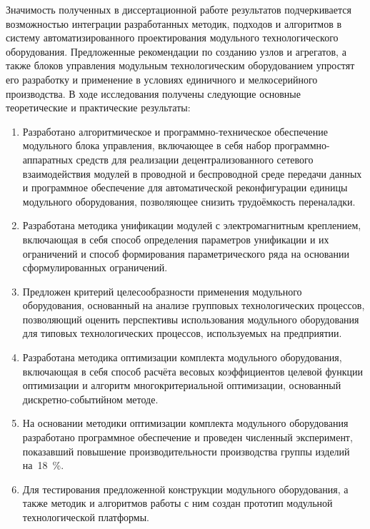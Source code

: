 
Значимость полученных в диссертационной работе результатов подчеркивается возможностью интеграции разработанных методик, подходов и алгоритмов в систему автоматизированного проектирования модульного технологического оборудования. Предложенные рекомендации по созданию узлов и агрегатов, а также блоков управления модульным технологическим оборудованием упростят его разработку и применение в условиях единичного и мелкосерийного производства.  В ходе исследования получены следующие основные теоретические и практические результаты:

\begin{enumerate}
  \item Разработано алгоритмическое и программно-техническое обеспечение модульного блока управления, включающее в себя набор программно-аппаратных средств для реализации децентрализованного сетевого взаимодействия модулей в проводной и беспроводной среде передачи данных и программное обеспечение для автоматической реконфигурации единицы модульного оборудования, позволяющее снизить трудоёмкость переналадки.  
  \item Разработана методика унификации модулей с электромагнитным креплением, включающая в себя способ определения параметров унификации и их ограничений и способ формирования параметрического ряда на основании сформулированных ограничений.
  \item Предложен критерий целесообразности применения модульного оборудования, основанный на анализе групповых технологических процессов, позволяющий оценить  перспективы использования модульного оборудования для типовых технологических процессов, используемых на предприятии.
  \item Разработана методика оптимизации комплекта модульного оборудования, включающая в себя способ расчёта весовых коэффициентов целевой функции оптимизации и алгоритм многокритериальной оптимизации, основанный дискретно-событийном методе.
  \item На основании методики оптимизации комплекта модульного оборудования разработано программное обеспечение и проведен численный эксперимент, показавший повышение производительности производства группы изделий на~\SI{18}{\percent}.
  \item Для тестирования предложенной конструкции модульного оборудования, а также методик и алгоритмов работы с ним создан прототип модульной технологической платформы.
\end{enumerate}

